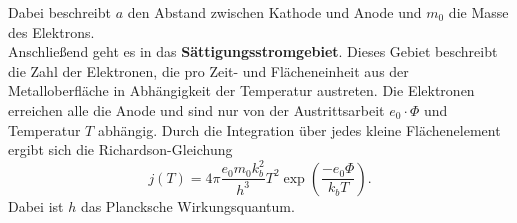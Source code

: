 Dabei beschreibt $a$ den Abstand zwischen Kathode und Anode und $m_0$ die Masse des Elektrons.\\
Anschließend geht es in das \textbf{Sättigungsstromgebiet}. Dieses Gebiet beschreibt die Zahl der Elektronen, die pro
Zeit- und Flächeneinheit aus der Metalloberfläche in Abhängigkeit der Temperatur austreten.
Die Elektronen erreichen alle die Anode und sind nur von der Austrittsarbeit $e_0 \cdot \Phi$ und Temperatur $T$
abhängig.
Durch die Integration über jedes kleine Flächenelement ergibt sich die Richardson-Gleichung
\begin{equation}
  j(T) = 4 \pi \frac{e_0 m_0 k_b^2}{h^3} T^2 \exp\left(\frac{-e_0 \Phi}{k_bT}\right).
  \label{eq:3}
\end{equation}
Dabei ist $h$ das Plancksche Wirkungsquantum.
